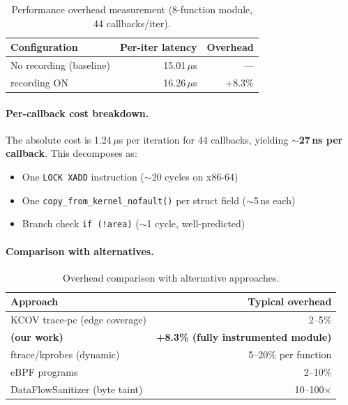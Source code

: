 \documentclass{ndss}
\begin{document}
\begin{table}[t]
\centering
\caption{Performance overhead measurement (8-function module, 44 callbacks/iter).}\label{tab:overhead}
\small
\begin{tabular}{@{}lrr@{}}
\toprule
\textbf{Configuration} & \textbf{Per-iter latency} & \textbf{Overhead} \\
\midrule
No recording (baseline) & 15.01\,$\mu$s & --- \\
\toolname{} recording ON & 16.26\,$\mu$s & +8.3\% \\
\bottomrule
\end{tabular}
\end{table}

\paragraph{Per-callback cost breakdown.}
The absolute cost is 1.24\,$\mu$s per iteration for 44 callbacks, yielding
$\sim$\textbf{27\,ns per callback}. This decomposes as:
\begin{itemize}[nosep]
  \item One \texttt{LOCK XADD} instruction ($\sim$20 cycles on x86-64)
  \item One \texttt{copy\_from\_kernel\_nofault()} per struct field ($\sim$5\,ns each)
  \item Branch check \texttt{if (!area)} ($\sim$1 cycle, well-predicted)
\end{itemize}

\paragraph{Comparison with alternatives.}
\begin{table}[t]
\centering
\caption{Overhead comparison with alternative approaches.}\label{tab:overhead-cmp}
\small
\begin{tabular}{@{}lr@{}}
\toprule
\textbf{Approach} & \textbf{Typical overhead} \\
\midrule
KCOV trace-pc (edge coverage) & 2--5\% \\
\textbf{\toolname{} (our work)} & \textbf{+8.3\% (fully instrumented module)} \\
ftrace/kprobes (dynamic) & 5--20\% per function \\
eBPF programs & 2--10\% \\
DataFlowSanitizer (byte taint) & 10--100$\times$ \\
\bottomrule
\end{tabular}
\end{table}
\end{document}
